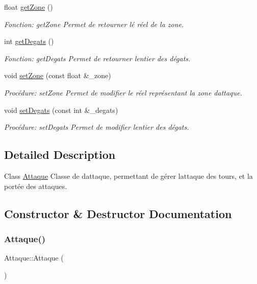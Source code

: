 \begin{DoxyCompactItemize}
float \hyperlink{classAttaque_a84b1813598ac33dfcb76652d7ad4ebd4}{get\+Zone} ()
\begin{DoxyCompactList}\small\item\em Fonction\+: get\+Zone Permet de retourner lé réel de la zone. \end{DoxyCompactList}\item 
int \hyperlink{classAttaque_a56856e2880988e4cf9b051d32ca427a3}{get\+Degats} ()
\begin{DoxyCompactList}\small\item\em Fonction\+: get\+Degats Permet de retourner l\textquotesingle{}entier des dégats. \end{DoxyCompactList}\item 
void \hyperlink{classAttaque_ae6dc5afd850f4518e937b8a2c08ac764}{set\+Zone} (const float \&\+\_\+zone)
\begin{DoxyCompactList}\small\item\em Procédure\+: set\+Zone Permet de modifier le réel représentant la zone d\textquotesingle{}attaque. \end{DoxyCompactList}\item 
void \hyperlink{classAttaque_ad1af4e5ae848c40c7879fa4f9a56c674}{set\+Degats} (const int \&\+\_\+degats)
\begin{DoxyCompactList}\small\item\em Procédure\+: set\+Degats Permet de modifier l\textquotesingle{}entier des dégats. \end{DoxyCompactList}\end{DoxyCompactItemize}


\subsection{Detailed Description}
Class \hyperlink{classAttaque}{Attaque} Classe de d\textquotesingle{}attaque, permettant de gérer l\textquotesingle{}attaque des tours, et la portée des attaques. 

\subsection{Constructor \& Destructor Documentation}
\mbox{\label{classAttaque_a1683db1342d1d26f9fc2162ef1975b23}} 
\subsubsection{\texorpdfstring{Attaque()}{Attaque()}\hspace{0.1cm}{\footnotesize\ttfamily [1/3]}}
{\footnotesize\ttfamily Attaque\+::\+Attaque (\begin{DoxyParamCaption}{ }\end{DoxyParamCaption})}



